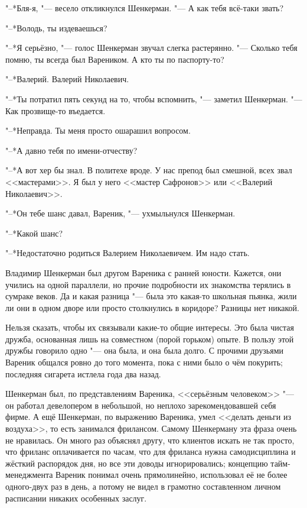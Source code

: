 "--*Бля-я, "--- весело откликнулся Шенкерман.
"--- А как тебя всё-таки звать?

"--*Володь, ты издеваешься?

"--*Я серьёзно, "--- голос Шенкерман звучал слегка растерянно.
"--- Сколько тебя помню, ты всегда был Вареником.
А кто ты по паспорту-то?

"--*Валерий.
Валерий Николаевич.

"--*Ты потратил пять секунд на то, чтобы вспомнить, "--- заметил Шенкерман.
"--- Как прозвище-то въедается.

"--*Неправда.
Ты меня просто ошарашил вопросом.

"--*А давно тебя по имени-отчеству?

"--*А вот хер бы знал.
В политехе вроде.
У нас препод был смешной, всех звал <<мастерами>>.
Я был у него <<мастер Сафронов>> или <<Валерий Николаевич>>.

"--*Он тебе шанс давал, Вареник, "--- ухмыльнулся Шенкерман.

"--*Какой шанс?

"--*Недостаточно родиться Валерием Николаевичем.
Им надо стать.

Владимир Шенкерман был другом Вареника с ранней юности.
Кажется, они учились на одной параллели, но прочие подробности их знакомства терялись в сумраке веков.
Да и какая разница "--- была это какая-то школьная пьянка, жили ли они в одном дворе или просто столкнулись в коридоре?
Разницы нет никакой.

Нельзя сказать, чтобы их связывали какие-то общие интересы.
Это была чистая дружба, основанная лишь на совместном (порой горьком) опыте.
В пользу этой дружбы говорило одно "--- она была, и она была долго.
С прочими друзьями Вареник общался ровно до того момента, пока с ними было о чём покурить;
последняя сигарета истлела года два назад.

Шенкерман был, по представлениям Вареника, <<серьёзным человеком>> "--- он работал девелопером в небольшой, но неплохо зарекомендовавшей себя фирме.
А ещё Шенкерман, по выражению Вареника, умел <<делать деньги из воздуха>>, то есть занимался фрилансом.
Самому Шенкерману эта фраза очень не нравилась.
Он много раз объяснял другу, что клиентов искать не так просто, что фриланс оплачивается по часам, что для фриланса нужна самодисциплина и жёсткий распорядок дня, но все эти доводы игнорировались;
концепцию тайм-менеджмента Вареник понимал очень прямолинейно, использовал её не более одного-двух раз в день, а потому не видел в грамотно составленном личном расписании никаких особенных заслуг.

